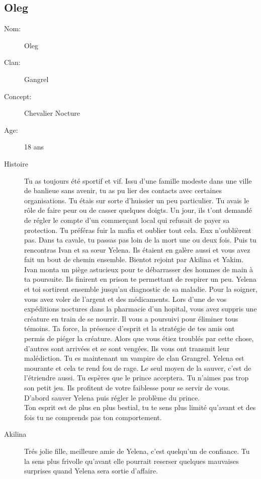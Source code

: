 \documentclass[oneside,12pt]{book}
\begin{document}
\begin{flushleft}
\section{Oleg}
\begin{description}
\item[Nom:]{Oleg}
\item[Clan:]{Gangrel}
\item[Concept:]{Chevalier Nocture}
\item[Age:]{18 ans}
\item[Histoire]{ Tu as toujours été sportif et vif. Issu d'une famille modeste dans une ville de banlieue sans avenir, tu as pu lier des contacts avec certaines organisations. Tu étais sur sorte d'huissier un peu particulier.
Tu avais le rôle de faire peur ou de casser quelques doigts. Un jour, ils t'ont demandé de régler le compte d'un commerçant local qui refusait de payer sa protection.
Tu préféras fuir la mafia et oublier tout cela. Eux n'oublièrent pas. Dans ta cavale, tu passas pas loin de la mort une ou deux fois.
Puis tu rencontras Ivan et sa sœur Yelena. Ils étaient en galère aussi et vous avez fait un bout de chemin ensemble. Bientot rejoint par Akilina et Yakim. Ivan monta un piège astucieux pour te débarrasser des hommes de main à ta poursuite.
Ils finirent en prison te permettant de respirer un peu. Yelena et toi sortirent ensemble jusqu'au diagnostic de sa maladie.
Pour la soigner, vous avez voler de l'argent et des médicaments.
Lors d'une de vos expéditions noctures dans la pharmacie d'un hopital, vous avez suppris une créature en train de se nourrir.
Il vous a poursuivi pour éliminer tous témoins. Ta force, la présence d'esprit et la stratégie de tes amis ont permis de piéger la créature.
Alors que vous étiez troublés par cette chose, d'autres sont arrivées et se sont vengées. Ils vous ont transmit leur malédiction. Tu es maintenant un vampire de clan Grangrel.
Yelena est mourante et cela te rend fou de rage. Le seul moyen de la sauver, c'est de l'étriendre aussi. Tu espères que le prince acceptera. Tu n'aimes pas trop son petit jeu.
Ils profitent de votre faiblesse pour se servir de vous.  D'abord sauver Yelena puis régler le problème du prince.
\\
Ton esprit est de plus en plus bestial, tu te sens plus limité qu'avant et des fois tu ne comprends pas ton comportement. 
}
\end{description}
\begin{description}
\item[Akilina]{Trés jolie fille, meilleure amie de Yelena, c'est quelqu'un de confiance. Tu la sens plus frivolle qu'avant elle pourrait reserser quelques mauvaises surprises quand Yelena sera sortie d'affaire.
}
\end{description}
\end{flushleft}
\end{document}

